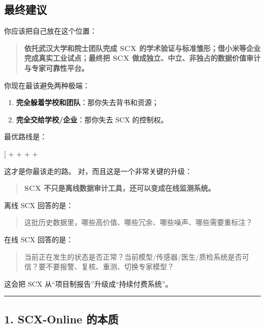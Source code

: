 \documentclass[
  12pt,
]{ctexart}
\providecommand{\tightlist}{%
  \setlength{\itemsep}{0pt}\setlength{\parskip}{0pt}}
\begin{document}
\subsection{最终建议}\label{ux6700ux7ec8ux5efaux8bae-1}

你应该把自己放在这个位置：

\begin{quote}
\textbf{依托武汉大学和院士团队完成 SCX
的学术验证与标准雏形；借小米等企业完成真实工业试点；最终把 SCX
做成独立、中立、非独占的数据价值审计与专家可靠性平台。}
\end{quote}

你现在最该避免两种极端：

\begin{enumerate}
\def\labelenumi{\arabic{enumi}.}
\tightlist
\item
  \textbf{完全躲着学校和团队}：那你失去背书和资源；
\item
  \textbf{完全交给学校/企业}：那你失去 SCX 的控制权。
\end{enumerate}

最优路线是：

{[}  +  +  +
 + \text{SCX-Core 独立控制}{]}

这才是你最该走的路。 对，而且这是一个非常关键的升级：

\begin{quote}
\textbf{SCX 不只是离线数据审计工具，还可以变成在线监测系统。}
\end{quote}

离线 SCX 回答的是：

\begin{quote}
这批历史数据里，哪些高价值、哪些冗余、哪些噪声、哪些需要重标注？
\end{quote}

在线 SCX 回答的是：

\begin{quote}
当前正在发生的状态是否正常？当前模型/传感器/医生/质检系统是否可信？要不要报警、复核、重测、切换专家模型？
\end{quote}

这会把 SCX 从``项目制报告''升级成``持续付费系统''。

\begin{center}\rule{0.5\linewidth}{0.5pt}\end{center}

\subsection{1. SCX-Online 的本质}\label{scx-online-ux7684ux672cux8d28}
\end{document}
